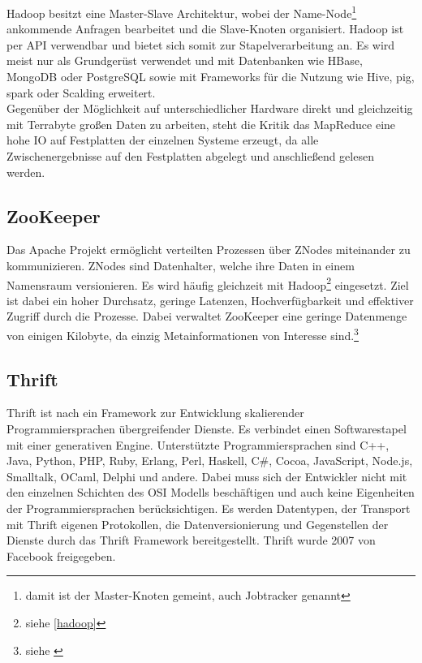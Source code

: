 Hadoop besitzt eine Master-Slave Architektur, wobei der Name-Node\footnote{damit ist der Master-Knoten gemeint, auch Jobtracker genannt} ankommende Anfragen bearbeitet und die Slave-Knoten organisiert.
Hadoop ist per API verwendbar und bietet sich somit zur Stapelverarbeitung an. %
Es wird meist nur als Grundgerüst verwendet und mit Datenbanken wie HBase, MongoDB oder PostgreSQL sowie mit Frameworks für die Nutzung wie Hive, \Gls{pig}, \Gls{spark} oder Scalding erweitert.\\
%
Gegenüber der Möglichkeit auf unterschiedlicher Hardware direkt und gleichzeitig mit Terrabyte großen Daten zu arbeiten, steht die Kritik das MapReduce eine hohe IO auf Festplatten der einzelnen Systeme erzeugt, da alle Zwischenergebnisse auf den Festplatten abgelegt und anschließend gelesen werden.

\subsection{ZooKeeper}
\label{zookeeper}
Das Apache Projekt ermöglicht verteilten Prozessen über ZNodes miteinander zu kommunizieren.
ZNodes sind Datenhalter, welche ihre Daten in einem Namensraum versionieren.
Es wird häufig gleichzeit mit Hadoop\footnote{siehe \ref{hadoop}} eingesetzt.
Ziel ist dabei ein hoher Durchsatz, geringe Latenzen, Hochverfügbarkeit und effektiver Zugriff durch die Prozesse.
Dabei verwaltet ZooKeeper eine geringe Datenmenge von einigen Kilobyte, da einzig Metainformationen von Interesse sind.\footnote{siehe \cite{website:zookeeper}} 



\subsection{Thrift}
\label{thrift}
Thrift ist nach \cite{website:thrift} ein Framework zur Entwicklung skalierender Programmiersprachen übergreifender Dienste.
Es verbindet einen Softwarestapel mit einer generativen Engine.
Unterstützte Programmiersprachen sind C++, Java, Python, PHP, Ruby, Erlang, Perl, Haskell, C\#, Cocoa, JavaScript, Node.js, Smalltalk, OCaml, Delphi und andere.
Dabei muss sich der Entwickler nicht mit den einzelnen Schichten des OSI Modells beschäftigen und auch keine Eigenheiten der Programmiersprachen berücksichtigen.
Es werden Datentypen, der Transport mit Thrift eigenen Protokollen, die Datenversionierung und Gegenstellen der Dienste durch das Thrift Framework bereitgestellt.
Thrift wurde 2007 von Facebook freigegeben. \cite[S.1]{paper:thrift}


